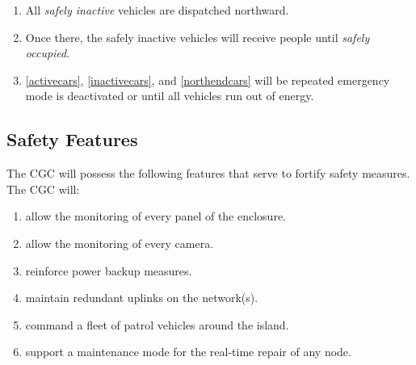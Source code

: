 \documentclass[12pt]{article}
\begin{document}
\begin{enumerate}
\begin{enumerate}
                \item{\label{inactivecars} All \textit{safely inactive} vehicles are dispatched northward.}
                \item{\label{northendcars} Once there, the {safely inactive} vehicles will receive people until \textit{safely occupied}.} 
                \item \ref{activecars}, \ref{inactivecars}, and \ref{northendcars} will be repeated emergency mode is deactivated or until
                all vehicles run out of energy.
            \end{enumerate}
    \end{enumerate}
    
    \subsection{Safety Features} The CGC will possess the following features that 
    serve to fortify safety measures. The CGC will:
    \begin{enumerate}
        \item allow the monitoring of every panel of the enclosure.
        \item allow the monitoring of every camera.
        \item reinforce power backup measures.
        \item maintain redundant uplinks on the network(s).
        \item command a fleet of patrol vehicles around the island.
        \item support a maintenance mode for the real-time repair of any node.
    \end{enumerate}
    
\end{document}
